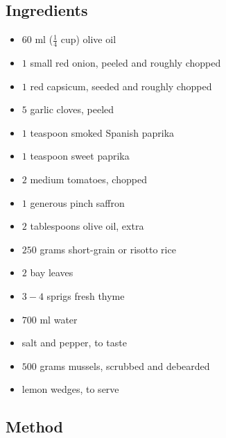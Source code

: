 \documentclass[11pt,a4paper]{article}
\begin{document}
\subsection*{Ingredients}

\begin{multicols}{2}

\begin{itemize}
  \item $ 60 $ ml ($\frac{1}{4} $ cup) olive oil
  \item $ 1 $ small red onion, peeled and roughly chopped
  \item $ 1 $ red capsicum, seeded and roughly chopped
  \item $ 5 $ garlic cloves, peeled
  \item $ 1 $ teaspoon smoked Spanish paprika
  \item $ 1 $ teaspoon sweet paprika
  \item $ 2 $ medium tomatoes, chopped
  \item $ 1 $ generous pinch saffron
\end{itemize}

\columnbreak

\begin{itemize}
  \item $ 2 $ tablespoons olive oil, extra
  \item $ 250 $ grams short-grain or risotto rice 
  \item $ 2 $ bay leaves
  \item $ 3 - 4 $ sprigs fresh thyme
  \item $ 700 $ ml water
  \item salt and pepper, to taste
  \item $ 500 $ grams mussels, scrubbed and debearded
  \item lemon wedges, to serve
\end{itemize}

\end{multicols}

\medskip

\subsection*{Method}
\end{document}
